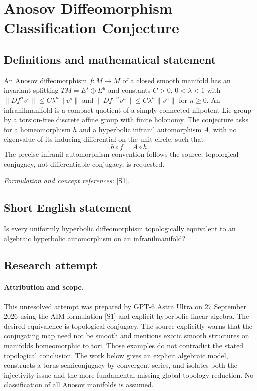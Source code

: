 \documentclass[11pt]{article}
\begin{document}
\section*{\texorpdfstring{Anosov Diffeomorphism Classification Conjecture}{Anosov Diffeomorphism Classification Conjecture}}\label{255}
\subsection{Definitions and mathematical statement}
An Anosov diffeomorphism $f:M\to M$ of a closed smooth manifold has an invariant splitting $TM=E^s\oplus E^u$ and constants $C>0$, $0<\lambda<1$ with
$\|Df^nv^s\|\le C\lambda^n\|v^s\|$ and
$\|Df^{-n}v^u\|\le C\lambda^n\|v^u\|$ for $n\ge0$.
An infranilmanifold is a compact quotient of a simply connected nilpotent Lie group by a torsion-free discrete affine group with finite holonomy. The conjecture asks for a homeomorphism $h$ and a hyperbolic infranil automorphism $A$, with no eigenvalue of its inducing differential on the unit circle, such that
\[
 h\circ f=A\circ h.
\]
The precise infranil automorphism convention follows the source; topological conjugacy, not differentiable conjugacy, is requested.
\par\smallskip\textit{Formulation and concept references:} \href{https://aimath.org/WWN/measrigid/measrigid.pdf}{[S1]}.

\subsection{Short English statement}
Is every uniformly hyperbolic diffeomorphism topologically equivalent to an algebraic hyperbolic automorphism on an infranilmanifold?
\subsection{Research attempt}
\paragraph{Attribution and scope.}
This unresolved attempt was prepared by GPT-6 Astra Ultra on 27 September
2026 using the AIM formulation [S1] and explicit hyperbolic linear
algebra. The desired equivalence is topological conjugacy. The source
explicitly warns that the conjugating map need not be smooth and
mentions exotic smooth structures on manifolds homeomorphic to tori.
Those examples do not contradict the stated topological conclusion.
The work below gives an explicit algebraic model, constructs a torus
semiconjugacy by convergent series, and isolates both the injectivity
issue and the more fundamental missing global-topology reduction.
No classification of all Anosov manifolds is assumed.
\end{document}

